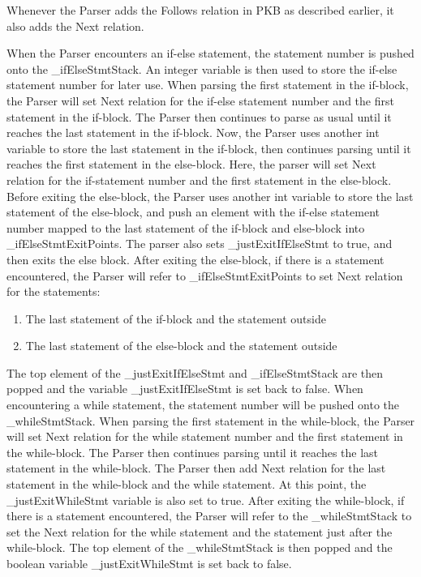 \documentclass[12pt]{article}
\begin{document}
\vspace{10mm}
Whenever the Parser adds the Follows relation in PKB as described earlier, it also adds the Next relation.

When the Parser encounters an if-else statement, the statement number is pushed onto the \_ifElseStmtStack. An integer variable is then used to store the if-else statement number for later use. When parsing the first statement in the if-block, the Parser will set Next relation for the if-else statement number and the first statement in the if-block. The Parser then continues to parse as usual until it reaches the last statement in the if-block. Now, the Parser uses another int variable to store the last statement in the if-block, then continues parsing until it reaches the first statement in the else-block. Here, the parser will set Next relation for the if-statement number and the first statement in the else-block. Before exiting the else-block, the Parser uses another int variable to store the last statement of the else-block, and push an element with the if-else statement number mapped to the last statement of the if-block and else-block into \_ifElseStmtExitPoints. The parser also sets \_justExitIfElseStmt to true, and then exits the else block. After exiting the else-block, if there is a statement encountered, the Parser will refer to \_ifElseStmtExitPoints to set Next relation for the statements:
\begin{enumerate}
\item The last statement of the if-block and the statement outside
\item The last statement of the else-block and the statement outside
\end{enumerate}
The top element of the \_justExitIfElseStmt and \_ifElseStmtStack are then popped and the variable \_justExitIfElseStmt is set back to false. \newline
When encountering a while statement, the statement number will be pushed onto the \_whileStmtStack. When parsing the first statement in the while-block, the Parser will set Next relation for the while statement number and the first statement in the while-block. The Parser then continues parsing until it reaches the last statement in the while-block. The Parser then add Next relation for the last statement in the while-block and the while statement. At this point, the \_justExitWhileStmt variable is also set to true. After exiting the while-block, if there is a statement encountered, the Parser will refer to the \_whileStmtStack to set the Next relation for the while statement and the statement just after the while-block. The top element of the \_whileStmtStack is then popped and the boolean variable \_justExitWhileStmt is set back to false. \newline
\end{document}
